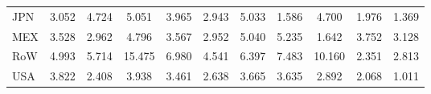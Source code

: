 \begin{table}[htbp]
\begin{tabular}{lcccccccccc}
  JPN & \textcolor[RGB]{158,102,97}{3.052} & \textcolor[RGB]{92,59,163}{4.724} & \textcolor[RGB]{79,51,176}{5.051} & \textcolor[RGB]{115,74,140}{3.965} & \textcolor[RGB]{171,111,84}{2.943} & \textcolor[RGB]{84,54,171}{5.033} & \textcolor[RGB]{224,145,31}{1.586} & \textcolor[RGB]{94,61,161}{4.700} & \textcolor[RGB]{209,135,46}{1.976} & \textcolor[RGB]{235,152,20}{1.369} \\ 
  MEX & \textcolor[RGB]{143,92,112}{3.528} & \textcolor[RGB]{166,107,89}{2.962} & \textcolor[RGB]{89,58,166}{4.796} & \textcolor[RGB]{140,91,115}{3.567} & \textcolor[RGB]{168,109,87}{2.952} & \textcolor[RGB]{82,53,173}{5.040} & \textcolor[RGB]{71,46,184}{5.235} & \textcolor[RGB]{219,142,36}{1.642} & \textcolor[RGB]{130,84,125}{3.752} & \textcolor[RGB]{156,101,99}{3.128} \\ 
  RoW & \textcolor[RGB]{87,56,168}{4.993} & \textcolor[RGB]{59,38,196}{5.714} & \textcolor[RGB]{25,16,230}{15.475} & \textcolor[RGB]{48,31,207}{6.980} & \textcolor[RGB]{99,64,156}{4.541} & \textcolor[RGB]{51,33,204}{6.397} & \textcolor[RGB]{46,30,209}{7.483} & \textcolor[RGB]{28,18,227}{10.160} & \textcolor[RGB]{194,125,61}{2.351} & \textcolor[RGB]{178,115,76}{2.813} \\ 
  USA & \textcolor[RGB]{122,79,133}{3.822} & \textcolor[RGB]{189,122,66}{2.408} & \textcolor[RGB]{117,76,138}{3.938} & \textcolor[RGB]{148,96,107}{3.461} & \textcolor[RGB]{184,119,71}{2.638} & \textcolor[RGB]{135,87,120}{3.665} & \textcolor[RGB]{138,89,117}{3.635} & \textcolor[RGB]{173,112,82}{2.892} & \textcolor[RGB]{204,132,51}{2.068} & \textcolor[RGB]{245,158,10}{1.011} \\ 
   \hline
\end{tabular}
\end{table}
